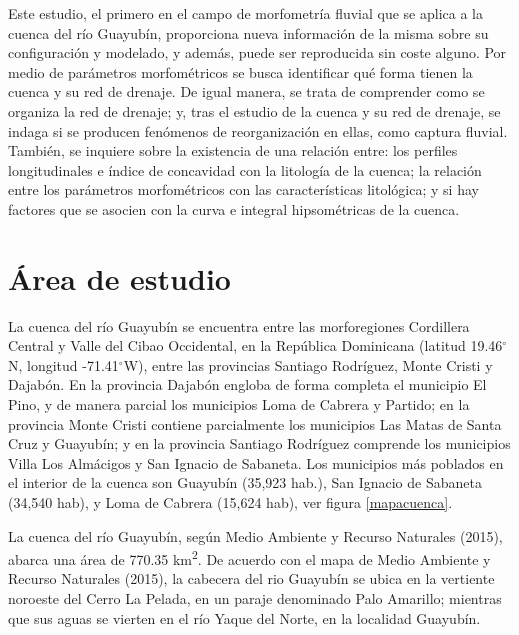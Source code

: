 \documentclass[11pt,]{article}
\begin{document}
Este estudio, el primero en el campo de morfometría fluvial que se
aplica a la cuenca del río Guayubín, proporciona nueva información de la
misma sobre su configuración y modelado, y además, puede ser reproducida
sin coste alguno. Por medio de parámetros morfométricos se busca
identificar qué forma tienen la cuenca y su red de drenaje. De igual
manera, se trata de comprender como se organiza la red de drenaje; y,
tras el estudio de la cuenca y su red de drenaje, se indaga si se
producen fenómenos de reorganización en ellas, como captura fluvial.
También, se inquiere sobre la existencia de una relación entre: los
perfiles longitudinales e índice de concavidad con la litología de la
cuenca; la relación entre los parámetros morfométricos con las
características litológica; y si hay factores que se asocien con la
curva e integral hipsométricas de la cuenca.

\section{Área de estudio}\label{uxe1rea-de-estudio}

La cuenca del río Guayubín se encuentra entre las morforegiones
Cordillera Central y Valle del Cibao Occidental, en la República
Dominicana (latitud 19.46\(^\circ\)N, longitud -71.41\(^\circ\)W), entre
las provincias Santiago Rodríguez, Monte Cristi y Dajabón. En la
provincia Dajabón engloba de forma completa el municipio El Pino, y de
manera parcial los municipios Loma de Cabrera y Partido; en la provincia
Monte Cristi contiene parcialmente los municipios Las Matas de Santa
Cruz y Guayubín; y en la provincia Santiago Rodríguez comprende los
municipios Villa Los Almácigos y San Ignacio de Sabaneta. Los municipios
más poblados en el interior de la cuenca son Guayubín (35,923 hab.), San
Ignacio de Sabaneta (34,540 hab), y Loma de Cabrera (15,624 hab), ver
figura \ref {mapacuenca}.

La cuenca del río Guayubín, según Medio Ambiente y Recurso Naturales
(2015), abarca una área de 770.35 km\textsuperscript{2}. De acuerdo con
el mapa de Medio Ambiente y Recurso Naturales (2015), la cabecera del
rio Guayubín se ubica en la vertiente noroeste del Cerro La Pelada, en
un paraje denominado Palo Amarillo; mientras que sus aguas se vierten en
el río Yaque del Norte, en la localidad Guayubín.
\end{document}

